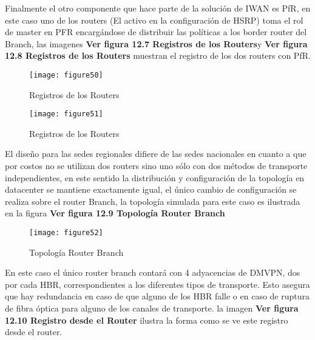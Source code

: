 Finalmente el otro componente que hace parte de la solución de IWAN es PfR, en este caso uno de los routers (El activo en la configuración de HSRP) toma el rol de master en PFR encargándose de distribuir las políticas a los border router del Branch, las imagenes \textbf{Ver figura 12.7 Registros de los Routers}y \textbf{Ver figura 12.8 Registros de los Routers} muestran el registro de los dos routers con PfR.

\begin{figure}[htbp]
  \centering
    {\texttt{[image: figure50]}}%
  \caption{Registros de los Routers}
  \label{fig:fig2subfig}
\end{figure}


\begin{figure}[htbp]
  \centering
    {\texttt{[image: figure51]}}%
  \caption{Registros de los Routers}
  \label{fig:fig2subfig}
\end{figure}

El diseño para las sedes regionales difiere de las sedes nacionales en cuanto a que por costos no se utilizan dos routers sino uno sólo con dos métodos de transporte independientes, en este sentido la distribución y configuración de la topología en datacenter se mantiene exactamente igual, el único cambio de configuración se realiza sobre el router Branch, la topología simulada para este caso es ilustrada en la figura \textbf{Ver figura 12.9 Topología Router Branch}

\begin{figure}[htbp]
  \centering
    {\texttt{[image: figure52]}}%
  \caption{Topología Router Branch}
  \label{fig:fig2subfig}
\end{figure}

En este caso el único router branch contará con 4 adyacencias de DMVPN, dos por cada HBR, correspondientes a los diferentes tipos de transporte. Esto asegura que hay redundancia en caso de que alguno de los HBR falle o en caso de ruptura de fibra óptica para alguno de los canales de transporte. la imagen \textbf{Ver figura 12.10 Registro desde el Router} ilustra la forma como se ve este registro desde el router.

